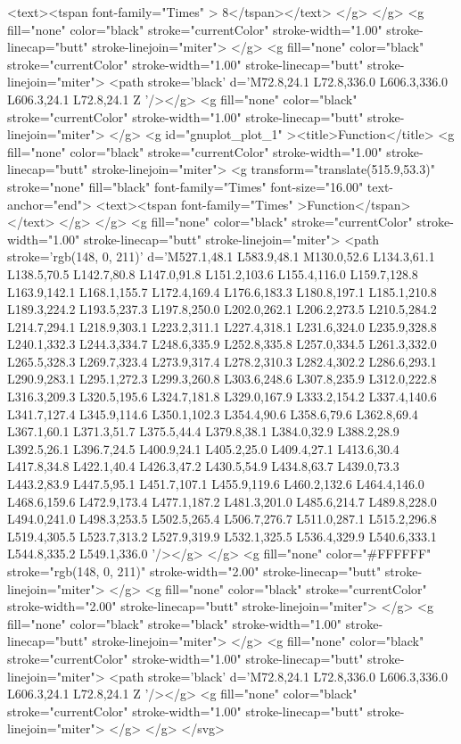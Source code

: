 		<text><tspan font-family="Times" > 8</tspan></text>
	</g>
</g>
<g fill="none" color="black" stroke="currentColor" stroke-width="1.00" stroke-linecap="butt" stroke-linejoin="miter">
</g>
<g fill="none" color="black" stroke="currentColor" stroke-width="1.00" stroke-linecap="butt" stroke-linejoin="miter">
	<path stroke='black'  d='M72.8,24.1 L72.8,336.0 L606.3,336.0 L606.3,24.1 L72.8,24.1 Z  '/></g>
<g fill="none" color="black" stroke="currentColor" stroke-width="1.00" stroke-linecap="butt" stroke-linejoin="miter">
</g>
	<g id="gnuplot_plot_1" ><title>Function</title>
<g fill="none" color="black" stroke="currentColor" stroke-width="1.00" stroke-linecap="butt" stroke-linejoin="miter">
	<g transform="translate(515.9,53.3)" stroke="none" fill="black" font-family="Times" font-size="16.00"  text-anchor="end">
		<text><tspan font-family="Times" >Function</tspan></text>
	</g>
</g>
<g fill="none" color="black" stroke="currentColor" stroke-width="1.00" stroke-linecap="butt" stroke-linejoin="miter">
	<path stroke='rgb(148,   0, 211)'  d='M527.1,48.1 L583.9,48.1 M130.0,52.6 L134.3,61.1 L138.5,70.5 L142.7,80.8 L147.0,91.8 L151.2,103.6
		L155.4,116.0 L159.7,128.8 L163.9,142.1 L168.1,155.7 L172.4,169.4 L176.6,183.3 L180.8,197.1 L185.1,210.8
		L189.3,224.2 L193.5,237.3 L197.8,250.0 L202.0,262.1 L206.2,273.5 L210.5,284.2 L214.7,294.1 L218.9,303.1
		L223.2,311.1 L227.4,318.1 L231.6,324.0 L235.9,328.8 L240.1,332.3 L244.3,334.7 L248.6,335.9 L252.8,335.8
		L257.0,334.5 L261.3,332.0 L265.5,328.3 L269.7,323.4 L273.9,317.4 L278.2,310.3 L282.4,302.2 L286.6,293.1
		L290.9,283.1 L295.1,272.3 L299.3,260.8 L303.6,248.6 L307.8,235.9 L312.0,222.8 L316.3,209.3 L320.5,195.6
		L324.7,181.8 L329.0,167.9 L333.2,154.2 L337.4,140.6 L341.7,127.4 L345.9,114.6 L350.1,102.3 L354.4,90.6
		L358.6,79.6 L362.8,69.4 L367.1,60.1 L371.3,51.7 L375.5,44.4 L379.8,38.1 L384.0,32.9 L388.2,28.9
		L392.5,26.1 L396.7,24.5 L400.9,24.1 L405.2,25.0 L409.4,27.1 L413.6,30.4 L417.8,34.8 L422.1,40.4
		L426.3,47.2 L430.5,54.9 L434.8,63.7 L439.0,73.3 L443.2,83.9 L447.5,95.1 L451.7,107.1 L455.9,119.6
		L460.2,132.6 L464.4,146.0 L468.6,159.6 L472.9,173.4 L477.1,187.2 L481.3,201.0 L485.6,214.7 L489.8,228.0
		L494.0,241.0 L498.3,253.5 L502.5,265.4 L506.7,276.7 L511.0,287.1 L515.2,296.8 L519.4,305.5 L523.7,313.2
		L527.9,319.9 L532.1,325.5 L536.4,329.9 L540.6,333.1 L544.8,335.2 L549.1,336.0  '/></g>
	</g>
<g fill="none" color="#FFFFFF" stroke="rgb(148,   0, 211)" stroke-width="2.00" stroke-linecap="butt" stroke-linejoin="miter">
</g>
<g fill="none" color="black" stroke="currentColor" stroke-width="2.00" stroke-linecap="butt" stroke-linejoin="miter">
</g>
<g fill="none" color="black" stroke="black" stroke-width="1.00" stroke-linecap="butt" stroke-linejoin="miter">
</g>
<g fill="none" color="black" stroke="currentColor" stroke-width="1.00" stroke-linecap="butt" stroke-linejoin="miter">
	<path stroke='black'  d='M72.8,24.1 L72.8,336.0 L606.3,336.0 L606.3,24.1 L72.8,24.1 Z  '/></g>
<g fill="none" color="black" stroke="currentColor" stroke-width="1.00" stroke-linecap="butt" stroke-linejoin="miter">
</g>
</g>
</svg>

